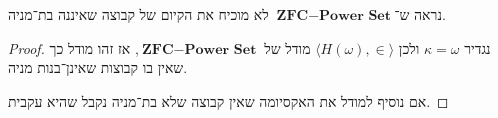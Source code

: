 \Question{}
נראה ש־$\textbf{ZFC} - \textbf{Power Set}$ לא מוכיח את הקיום של קבוצה שאיננה בת־מניה.
\begin{proof}
	נגדיר $\kappa = \omega$ ולכן $\langle H(\omega), \in \rangle$ מודל של $\textbf{ZFC} - \textbf{Power Set}$, אז זהו מודל כך שאין בו קבוצות שאינן־בנות מניה.

	אם נוסיף למודל את האקסיומה שאין קבוצה שלא בת־מניה נקבל שהיא עקבית.
\end{proof}


